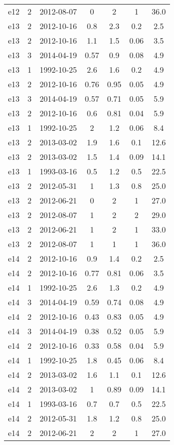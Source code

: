 \begin{table*}[htp]
\begin{tabular}{ccccccc}
e12 & 2 & 2012-08-07 & 0 & 2 & 1 & 36.0 \\
e13 & 2 & 2012-10-16 & 0.8 & 2.3 & 0.2 & 2.5 \\
e13 & 2 & 2012-10-16 & 1.1 & 1.5 & 0.06 & 3.5 \\
e13 & 3 & 2014-04-19 & 0.57 & 0.9 & 0.08 & 4.9 \\
e13 & 1 & 1992-10-25 & 2.6 & 1.6 & 0.2 & 4.9 \\
e13 & 2 & 2012-10-16 & 0.76 & 0.95 & 0.05 & 4.9 \\
e13 & 3 & 2014-04-19 & 0.57 & 0.71 & 0.05 & 5.9 \\
e13 & 2 & 2012-10-16 & 0.6 & 0.81 & 0.04 & 5.9 \\
e13 & 1 & 1992-10-25 & 2 & 1.2 & 0.06 & 8.4 \\
e13 & 2 & 2013-03-02 & 1.9 & 1.6 & 0.1 & 12.6 \\
e13 & 2 & 2013-03-02 & 1.5 & 1.4 & 0.09 & 14.1 \\
e13 & 1 & 1993-03-16 & 0.5 & 1.2 & 0.5 & 22.5 \\
e13 & 2 & 2012-05-31 & 1 & 1.3 & 0.8 & 25.0 \\
e13 & 2 & 2012-06-21 & 0 & 2 & 1 & 27.0 \\
e13 & 2 & 2012-08-07 & 1 & 2 & 2 & 29.0 \\
e13 & 2 & 2012-06-21 & 1 & 2 & 1 & 33.0 \\
e13 & 2 & 2012-08-07 & 1 & 1 & 1 & 36.0 \\
e14 & 2 & 2012-10-16 & 0.9 & 1.4 & 0.2 & 2.5 \\
e14 & 2 & 2012-10-16 & 0.77 & 0.81 & 0.06 & 3.5 \\
e14 & 1 & 1992-10-25 & 2.6 & 1.3 & 0.2 & 4.9 \\
e14 & 3 & 2014-04-19 & 0.59 & 0.74 & 0.08 & 4.9 \\
e14 & 2 & 2012-10-16 & 0.43 & 0.83 & 0.05 & 4.9 \\
e14 & 3 & 2014-04-19 & 0.38 & 0.52 & 0.05 & 5.9 \\
e14 & 2 & 2012-10-16 & 0.33 & 0.58 & 0.04 & 5.9 \\
e14 & 1 & 1992-10-25 & 1.8 & 0.45 & 0.06 & 8.4 \\
e14 & 2 & 2013-03-02 & 1.6 & 1.1 & 0.1 & 12.6 \\
e14 & 2 & 2013-03-02 & 1 & 0.89 & 0.09 & 14.1 \\
e14 & 1 & 1993-03-16 & 0.7 & 0.7 & 0.5 & 22.5 \\
e14 & 2 & 2012-05-31 & 1.8 & 1.2 & 0.8 & 25.0 \\
e14 & 2 & 2012-06-21 & 2 & 2 & 1 & 27.0 \\

\end{tabular}
\end{table*}

